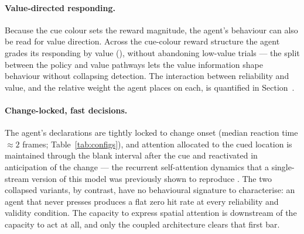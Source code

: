 \paragraph{Value-directed responding.}
Because the cue colour sets the reward magnitude, the agent's behaviour can also be
read for value direction. Across the cue-colour reward structure the agent grades
its responding by value (), without
abandoning low-value trials --- the split between the policy and value pathways lets
the value information shape behaviour without collapsing detection. The interaction
between reliability and value, and the relative weight the agent places on each, is
quantified in Section~.

\paragraph{Change-locked, fast decisions.}
The agent's declarations are tightly locked to change onset (median reaction time
$\approx 2$ frames; Table~\ref{tab:configs}), and attention allocated to the cued
location is maintained through the blank interval after the cue and reactivated in
anticipation of the change --- the recurrent self-attention dynamics that a
single-stream version of this model was previously shown to reproduce
\citep{herman2017color, ghose2002attentional, nobre2018anticipated}. The two
collapsed variants, by contrast, have no behavioural signature to characterise: an
agent that never presses produces a flat zero hit rate at every reliability and
validity condition. The capacity to express spatial attention is downstream of the
capacity to act at all, and only the coupled architecture clears that first bar.
